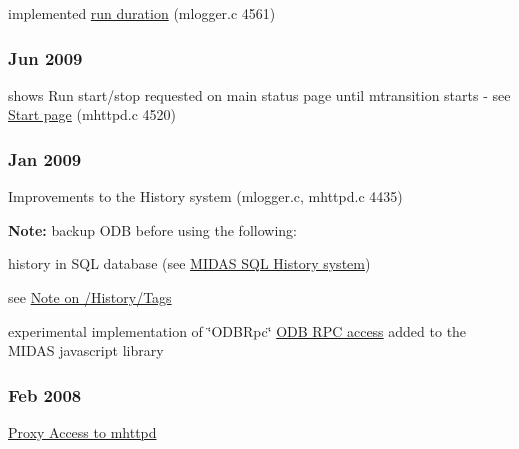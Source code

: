\begin{DoxyItemize}
\item implemented \hyperlink{F_Logging_Data_F_Logger_Run_Duration}{run duration} (mlogger.c 4561)
\end{DoxyItemize}\hypertarget{NDF_ndf_jun_2009}{}\subsubsection{Jun 2009}\label{NDF_ndf_jun_2009}

\begin{DoxyItemize}
\item shows Run start/stop requested on main status page until mtransition starts -\/ see \hyperlink{RC_mhttpd_Start_page}{Start page} (mhttpd.c 4520)
\end{DoxyItemize}\hypertarget{NDF_ndf_jan_2009}{}\subsubsection{Jan 2009}\label{NDF_ndf_jan_2009}

\begin{DoxyItemize}
\item Improvements to the History system (mlogger.c, mhttpd.c 4435)\par
 {\bfseries Note:} backup ODB before using the following:
\begin{DoxyItemize}
\item history in SQL database (see \hyperlink{F_History_logging_F_History_sql_internal}{MIDAS SQL History system})
\begin{DoxyItemize}
\item see \hyperlink{F_History_logging_F_new_history_tags}{Note on /History/Tags}
\end{DoxyItemize}
\item experimental implementation of \char`\"{}ODBRpc\char`\"{} \hyperlink{RC_mhttpd_custom_RPC_access}{ODB RPC access} added to the MIDAS javascript library
\end{DoxyItemize}
\end{DoxyItemize}\hypertarget{NDF_ndf_feb_2008}{}\subsubsection{Feb 2008}\label{NDF_ndf_feb_2008}

\begin{DoxyItemize}
\item \hyperlink{RC_mhttpd_utility_RC_mhttpd_proxy}{Proxy Access to mhttpd}
\end{DoxyItemize}

\par
 \label{index_end}
\hypertarget{index_end}{}
  \par
 
